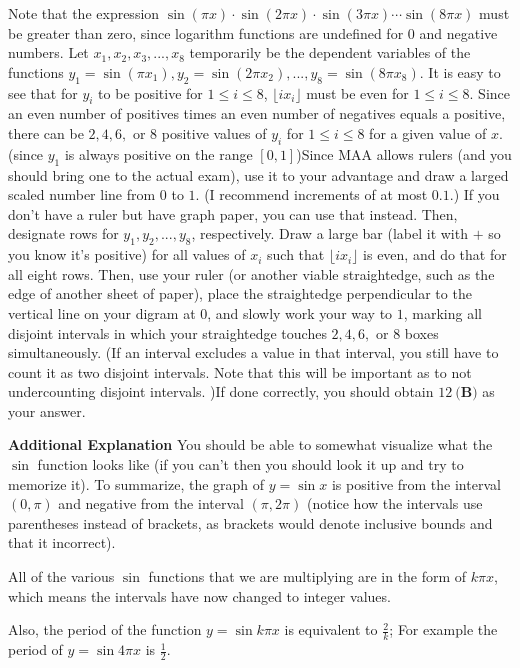 \begin{enumerate}
Note that the expression $\sin(\pi x) \cdot \sin(2 \pi x) \cdot \sin (3 \pi x) \cdots \sin(8 \pi x)$  must be greater than zero, since logarithm functions are undefined for $0$ and negative numbers. Let $x_1, x_2, x_3, ..., x_8$ temporarily be the dependent variables of the functions $y_1 = \sin(\pi x_1), y_2 = \sin(2\pi x_2), ..., y_8 = \sin(8\pi x_8)$. It is easy to see that for $y_i$ to be positive for $1\leq i\leq8$, $\lfloor i x_i \rfloor$ must be even for $1 \leq i\leq8$. Since an even number of positives times an even number of negatives equals a positive, there can be $2, 4, 6,$ or $8$ positive values of $y_i$ for $1 \leq i\leq 8$ for a given value of $x$. (since $y_1$ is always positive on the range $[0, 1]$)Since MAA allows rulers (and you should bring one to the actual exam), use it to your advantage and draw a larged scaled number line from $0$ to $1$. (I recommend increments of at most $0.1$.) If you don't have a ruler but have graph paper, you can use that instead. Then, designate rows for $y_1, y_2, ..., y_8$, respectively. Draw a large bar (label it with $+$ so you know it's positive) for all values of $x_i$ such that $\lfloor i x_i \rfloor$ is even, and do that for all eight rows. Then, use your ruler (or another viable straightedge, such as the edge of another sheet of paper), place the straightedge perpendicular to the vertical line on your digram at $0$, and slowly work your way to $1$, marking all disjoint intervals in which your straightedge touches $2, 4, 6,$ or $8$ boxes simultaneously. (If an interval excludes a value in that interval, you still have to count it as two disjoint intervals. Note that this will be important as to not undercounting disjoint intervals. )If done correctly, you should obtain $\boxed{12\ \textbf{(B)}}$ as your answer.

 \textbf{Additional Explanation} You should be able to somewhat visualize what the $\sin$ function looks like (if you can't then you should look it up and try to memorize it). To summarize, the graph of $y= \sin{x}$ is positive from the interval $(0, \pi)$ and negative from the interval $(\pi, 2\pi)$ (notice how the intervals use parentheses instead of brackets, as brackets would denote inclusive bounds and that it incorrect).

 
All of the various $\sin$ functions that we are multiplying are in the form of $k\pi x$, which means the intervals have now changed to integer values.

 
Also, the period of the function $y =\sin{k \pi x}$ is equivalent to $\frac{2}{k}$; For example the period of $y=  \sin{4\pi x}$ is $\frac{1}{2}$.


\end{enumerate}
